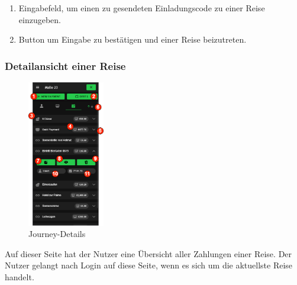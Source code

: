\begin{enumerate}[label=\protect\circled{\arabic*}]
	\item Eingabefeld, um einen zu gesendeten Einladungscode zu einer Reise 		einzugeben.
	\item Button um Eingabe zu bestätigen und einer Reise beizutreten.
\end{enumerate}

\subsubsection{Detailansicht einer Reise}\label{Journey-Details}
\begin{figure}[H]
	\centering
	\includegraphics[width=0.3\textwidth]{img/pages_numbers/journey-details.drawio}
	\caption[Journey-Details]{Journey-Details}
	\label{fig:Journey-Details}
\end{figure}

Auf dieser Seite hat der Nutzer eine Übersicht aller Zahlungen einer Reise.
Der Nutzer gelangt nach Login auf diese Seite, wenn es sich um die aktuellste Reise handelt.

